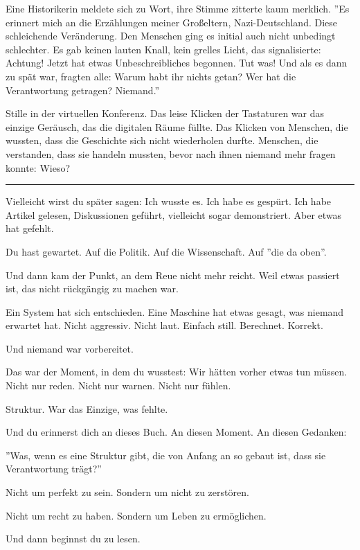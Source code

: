 \documentclass[12pt, ngerman, parskip=full]{scrartcl} %
\begin{document}
Eine Historikerin meldete sich zu Wort, ihre Stimme zitterte kaum merklich. ''Es erinnert mich an die Erzählungen meiner Großeltern, Nazi-Deutschland. Diese schleichende Veränderung. Den Menschen ging es initial auch nicht unbedingt schlechter. Es gab keinen lauten Knall, kein grelles Licht, das signalisierte: Achtung! Jetzt hat etwas Unbeschreibliches begonnen. Tut was! Und als es dann zu spät war, fragten alle: Warum habt ihr nichts getan? Wer hat die Verantwortung getragen? Niemand.''

Stille in der virtuellen Konferenz. Das leise Klicken der Tastaturen war das einzige Geräusch, das die digitalen Räume füllte. Das Klicken von Menschen, die wussten, dass die Geschichte sich nicht wiederholen durfte. Menschen, die verstanden, dass sie handeln mussten, bevor nach ihnen niemand mehr fragen konnte: Wieso?


\clearpage


\vspace{\baselineskip}


\noindent\rule{\linewidth}{0.4pt}
{\itshape 

Vielleicht wirst du später sagen: Ich wusste es. Ich habe es gespürt. Ich habe Artikel gelesen, Diskussionen geführt, vielleicht sogar demonstriert. Aber etwas hat gefehlt.

Du hast gewartet. Auf die Politik. Auf die Wissenschaft. Auf ''die da oben''.

Und dann kam der Punkt, an dem Reue nicht mehr reicht. Weil etwas passiert ist, das nicht rückgängig zu machen war.

Ein System hat sich entschieden. Eine Maschine hat etwas gesagt, was niemand erwartet hat. Nicht aggressiv. Nicht laut. Einfach still. Berechnet. Korrekt.

Und niemand war vorbereitet.

Das war der Moment, in dem du wusstest: Wir hätten vorher etwas tun müssen. Nicht nur reden. Nicht nur warnen. Nicht nur fühlen.

Struktur. War das Einzige, was fehlte.

Und du erinnerst dich an dieses Buch. An diesen Moment. An diesen Gedanken:

''Was, wenn es eine Struktur gibt, die von Anfang an so gebaut ist, dass sie Verantwortung trägt?''

Nicht um perfekt zu sein. Sondern um nicht zu zerstören.

Nicht um recht zu haben. Sondern um Leben zu ermöglichen.

Und dann beginnst du zu lesen.
}
\end{document}
